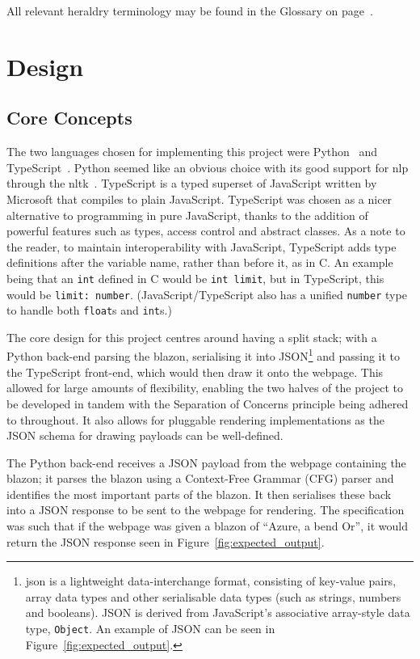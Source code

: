 \documentclass[nobib, a4paper, twoside, justified]{tufte-book}
\makeatletter
\newcommand{\blazon}{\gls{blazon}\@\xspace}
\newcommand{\payload}{\gls{payload}\@\xspace}
\newcommand{\payloads}{\glspl{payload}\@\xspace}
\makeatother
\begin{document}
All relevant heraldry terminology may be found in the Glossary on page~\pageref{main}.

\chapter{Design}%
\label{cha:design}

\section{Core Concepts}%
\label{sec:core_concepts}

The two languages chosen for implementing this project were Python~\autocite{python} and
TypeScript~\autocite{typescript}. Python seemed like an obvious choice with its good support for
\gls{nlp} through the \gls{nltk}~\autocite{bird2004nltk}. TypeScript is a typed superset of
JavaScript written by Microsoft that compiles to plain JavaScript.  TypeScript was chosen as a
nicer alternative to programming in pure JavaScript, thanks to the addition of powerful features
such as types, access control and abstract classes. As a note to the reader, to maintain
interoperability with JavaScript, TypeScript adds type definitions after the variable name, rather
than before it, as in C. An example being that an \texttt{int} defined in C would be \texttt{int
limit}, but in TypeScript, this would be \texttt{limit: number}. (JavaScript/TypeScript also has a
unified \texttt{number} type to handle both \texttt{float}s and \texttt{int}s.)

The core design for this project centres around having a split stack; with a Python back-end
parsing the \blazon, serialising it into JSON\footnote{\gls{json} is a lightweight data-interchange
  format, consisting of key-value pairs, array data types and other serialisable data types (such
  as strings, numbers and booleans). JSON is derived from JavaScript's associative array-style data
type, \texttt{Object}. An example of JSON can be seen in Figure~\ref{fig:expected_output}.} and
passing it to the TypeScript front-end, which would then draw it onto the webpage. This allowed for
large amounts of flexibility, enabling the two halves of the project to be developed in tandem with
the Separation of Concerns principle being adhered to throughout. It also allows for pluggable
rendering implementations as the JSON schema for drawing \payloads can be well-defined.

The Python back-end receives a JSON \payload from the webpage containing the \blazon; it parses the
\blazon using a Context-Free Grammar (CFG) parser and identifies the most important parts of the
\blazon. It then serialises these back into a JSON response to be sent to the webpage for rendering.
The specification was such that if the webpage was given a \blazon of ``Azure, a bend Or'', it would
return the JSON response seen in Figure~\ref{fig:expected_output}.
\end{document}
